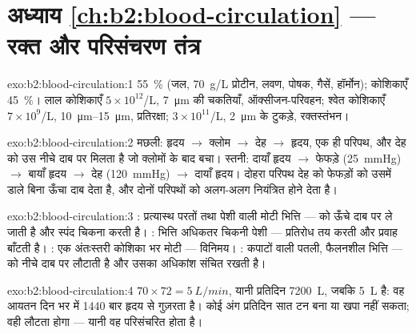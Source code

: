 \section*{अध्याय \ref{ch:b2:blood-circulation} --- रक्त और परिसंचरण तंत्र}

\begin{solution}{exo:b2:blood-circulation:1}
 \qty{55}{\%} (जल, \qty{70}{g/L} प्रोटीन, लवण,
पोषक, गैसें, हॉर्मोन); कोशिकाएँ \qty{45}{\%}। लाल कोशिकाएँ $5\times
10^{12}$/L, \qty{7}{\micro m} की चकतियाँ, ऑक्सीजन-परिवहन; श्वेत कोशिकाएँ
$7\times 10^{9}$/L, \qtyrange{10}{15}{\micro m}, प्रतिरक्षा; 
$3\times 10^{11}$/L, \qty{2}{\micro m} के टुकड़े, रक्तस्तंभन।
\end{solution}

\begin{solution}{exo:b2:blood-circulation:2}
मछली: हृदय $\to$ क्लोम $\to$ देह $\to$ हृदय, एक ही परिपथ, और देह को
 उस नीचे दाब पर मिलता है जो क्लोमों के बाद बचा। स्तनी:
दायाँ हृदय $\to$ फेफड़े (\qty{25}{mmHg}) $\to$ बायाँ हृदय $\to$ देह
(\qty{120}{mmHg}) $\to$ दायाँ हृदय। दोहरा परिपथ देह को
फेफड़ों को उसमें डाले बिना ऊँचा दाब देता है, और दोनों
परिपथों को अलग-अलग नियंत्रित होने देता है।
\end{solution}

\begin{solution}{exo:b2:blood-circulation:3}
: प्रत्यास्थ परतों तथा पेशी वाली मोटी भित्ति ---  को
ऊँचे दाब पर ले जाती है और स्पंद चिकना करती है। : भित्ति अधिकतर
चिकनी पेशी --- प्रतिरोध तय करती और प्रवाह बाँटती है। :
एक अंतःस्तरी कोशिका भर मोटी --- विनिमय। : कपाटों वाली पतली,
फैलनशील भित्ति ---  को नीचे दाब पर लौटाती है और उसका अधिकांश
संचित रखती है।
\end{solution}

\begin{solution}{exo:b2:blood-circulation:4}
$70\times 72 = \qty{5}{L/min}$, यानी प्रतिदिन \qty{7200}{L}, जबकि 
\qty{5}{L} है: वह आयतन दिन भर में \num{1440} बार
हृदय से गुज़रता है। कोई अंग प्रतिदिन सात टन  बना या खपा नहीं
सकता; वही  लौटता होगा --- यानी वह परिसंचरित होता है।
\end{solution}

